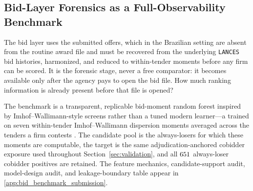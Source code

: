 \subsection{Bid-Layer Forensics as a Full-Observability Benchmark}
\label{sec:bid_layer_benchmark}

The bid layer uses the submitted offers, which in the Brazilian
setting are absent from the routine award file and must be recovered
from the underlying \texttt{LANCES} bid histories, harmonized, and
reduced to within-tender moments before any firm can be scored. It is
the forensic stage, never a free comparator: it becomes available only
after the agency pays to open the bid file. How much ranking
information is already present before that file is opened?

The benchmark is a transparent, replicable bid-moment random forest
inspired by Imhof--Wallimann-style screens rather than a tuned modern
learner---a \valBidLearner{} trained on seven within-tender
Imhof--Wallimann dispersion moments averaged across the tenders a firm
contests
\citep{abrantesmetz2006a,imhof2018screening,imhof2019detecting,huber2019machine,wallimann2023machine}.
The candidate pool is the always-losers for which these moments are
computable, the target is the same adjudication-anchored cobidder
exposure used throughout Section~\ref{sec:validation}, and all
$651$ always-loser cobidder positives are retained. The
feature mechanics, candidate-support audit, model-design audit, and
leakage-boundary table appear in \ref{app:bid_benchmark_submission}.

